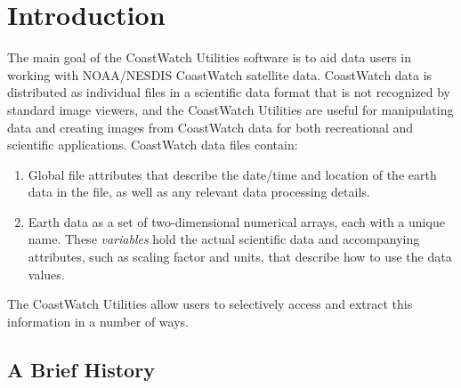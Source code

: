 \chapter{Introduction}

The main goal of the CoastWatch Utilities software is to aid data
users in working with NOAA/NESDIS CoastWatch satellite data. 
CoastWatch data is distributed as individual files in a scientific
data format that is not recognized by standard image viewers, and the
CoastWatch Utilities are useful for manipulating data and creating images
from CoastWatch data for both recreational and scientific
applications.  CoastWatch data files contain:
\begin{enumerate}

  \item Global file attributes that describe the date/time and
  location of the earth data in the file, as well as any relevant data
  processing details.

  \item Earth data as a set of two-dimensional numerical arrays, each
  with a unique name.  These {\em variables} hold the actual
  scientific data and accompanying attributes, such as scaling factor
  and units, that describe how to use the data values.

\end{enumerate}
The CoastWatch Utilities allow users to selectively access and extract
this information in a number of ways.

\section{A Brief History}

